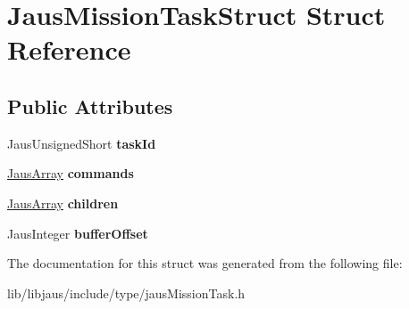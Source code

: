 \hypertarget{struct_jaus_mission_task_struct}{\section{\-Jaus\-Mission\-Task\-Struct \-Struct \-Reference}
\label{struct_jaus_mission_task_struct}
}
\subsection*{\-Public \-Attributes}
\begin{DoxyCompactItemize}
\item 
\hypertarget{struct_jaus_mission_task_struct_affa8585a0b29428b5fc6c78c14711759}{\-Jaus\-Unsigned\-Short {\bfseries task\-Id}}\label{struct_jaus_mission_task_struct_affa8585a0b29428b5fc6c78c14711759}

\item 
\hypertarget{struct_jaus_mission_task_struct_a358c6658187cbe1993773b9bfed63b65}{\hyperlink{struct_jaus_array_struct}{\-Jaus\-Array} {\bfseries commands}}\label{struct_jaus_mission_task_struct_a358c6658187cbe1993773b9bfed63b65}

\item 
\hypertarget{struct_jaus_mission_task_struct_a5ca43f54ad8ce95468347409fb108fb9}{\hyperlink{struct_jaus_array_struct}{\-Jaus\-Array} {\bfseries children}}\label{struct_jaus_mission_task_struct_a5ca43f54ad8ce95468347409fb108fb9}

\item 
\hypertarget{struct_jaus_mission_task_struct_ad39dfd06814bafcef3a927c83c0d00b6}{\-Jaus\-Integer {\bfseries buffer\-Offset}}\label{struct_jaus_mission_task_struct_ad39dfd06814bafcef3a927c83c0d00b6}

\end{DoxyCompactItemize}


\-The documentation for this struct was generated from the following file\-:\begin{DoxyCompactItemize}
\item 
lib/libjaus/include/type/jaus\-Mission\-Task.\-h\end{DoxyCompactItemize}
